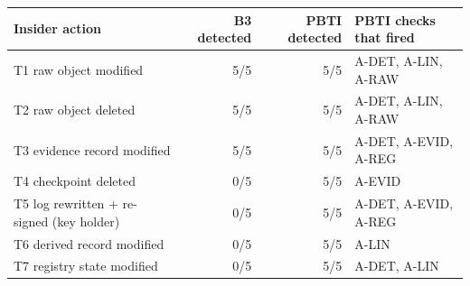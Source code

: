 \begin{tabular}{lrrl}
\toprule
\textbf{Insider action} & \textbf{B3 detected} & \textbf{PBTI detected} & \textbf{PBTI checks that fired}\\
\midrule
T1 raw object modified & 5/5 & 5/5 & A-DET, A-LIN, A-RAW\\
T2 raw object deleted & 5/5 & 5/5 & A-DET, A-LIN, A-RAW\\
T3 evidence record modified & 5/5 & 5/5 & A-DET, A-EVID, A-REG\\
T4 checkpoint deleted & 0/5 & 5/5 & A-EVID\\
T5 log rewritten + re-signed (key holder) & 0/5 & 5/5 & A-DET, A-EVID, A-REG\\
T6 derived record modified & 0/5 & 5/5 & A-LIN\\
T7 registry state modified & 0/5 & 5/5 & A-DET, A-LIN\\
\bottomrule
\end{tabular}